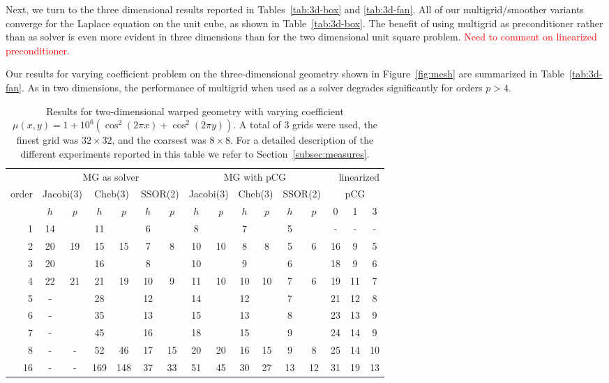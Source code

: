 \documentclass[smallcondensed,final]{svjour3}     %
\newcommand{\todo}[1]{\textcolor{red}{ #1}}
\begin{document}
Next, we turn to the three dimensional results reported in
Tables~\ref{tab:3d-box} and \ref{tab:3d-fan}. All of our
multigrid/smoother variants converge for the Laplace equation on the
unit cube, as shown in Table~\ref{tab:3d-box}. The benefit of using
multigrid as preconditioner rather than as solver is even more evident
in three dimensions than for the two dimensional unit square
problem. \todo{Need to comment on linearized preconditioner.}

Our results for varying coefficient problem on the three-dimensional
geometry shown in Figure~\ref{fig:mesh} are summarized in
Table~\ref{tab:3d-fan}. As in two dimensions, the performance of
multigrid when used as a solver degrades significantly for orders
$p>4$.


\begin{table}
  \caption{\label{tab:2d-fan} Results for two-dimensional warped
    geometry with varying coefficient $\mu(x,y) = 1 + 10^6(\cos^2(2\pi
    x) + \cos^2(2\pi y))$.  A total of 3 grids were used, the finest
    grid was $32\times 32$, and the coarsest was $8\times 8$. For a
    detailed description of the different experiments reported in this
    table we refer to Section~\ref{subsec:measures}.}  \centering
  \begin{tabular}{|r|c c|c c|c c||c c|c c|c c||c c c|} 
    \hline
    & \multicolumn{6}{c||}{MG as solver} & \multicolumn{6}{c||}{MG with pCG} & \multicolumn{3}{r|}{linearized} \\
    \cline{2-13}
    \!\!\! order \!\!\!\! &  \multicolumn{2}{c|}{\!\scriptsize  Jacobi(3)\!} &  \multicolumn{2}{c|}{\!\scriptsize Cheb(3)\!} & \multicolumn{2}{c||}{\!\scriptsize  SSOR(2)\!} & \multicolumn{2}{c|}{\!\scriptsize Jacobi(3)\!} &  \multicolumn{2}{c|}{\!\scriptsize Cheb(3)\!} & \multicolumn{2}{c||}{\!\scriptsize SSOR(2)\!} & \multicolumn{3}{c|}{pCG}\\
\hline
 & $h$ & $p$ & $h$ & $p$& $h$ & $p$& $h$ & $p$& $h$ & $p$& $h$ & $p$& 0 & 1 & 3\\
 \cline{2-16}
1 & 14 & & 11 & & 6 & & 8 & & 7 & & 5 & & - & - & - \\
2 & 20 & 19 & 15 & 15 & 7 & 8 & 10 & 10 & 8 & 8 & 5 & 6 & 16 & 9 & 5 \\
3 & 20 & & 16 & & 8 & & 10 & & 9 & & 6 & & 18 & 9 & 6 \\
4 & 22 & 21 & 21 & 19 & 10 & 9 & 11 & 10 & 10 & 10 & 7 & 6 & 19 & 11 & 7\\
5 & -  & & 28 & & 12 & & 14 & & 12 & & 7 & & 21 & 12 & 8  \\
6 & -  & & 35 & & 13 & & 15 & & 13 & & 8 & & 23 & 13 & 9 \\
7 & -  & & 45 & & 16 & & 18 & & 15 & & 9 & & 24 & 14 & 9 \\
8 & -  & - & 52 & 46 & 17 & 15 & 20 & 20 & 16 & 15 & 9 & 8 & 25 & 14 & 10 \\
16 & - & - & 169 & 148 & 37 & 33 & 51 & 45 & 30 & 27 & 13 & 12 & 31 & 19 & 13 \\
\hline
  \end{tabular}
\end{table}
\end{document}
